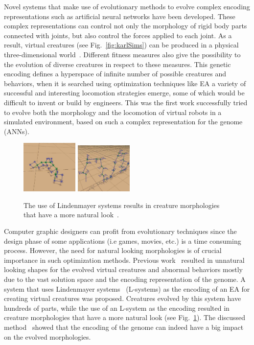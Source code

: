 Novel systems that make use of evolutionary methods to evolve complex encoding representations such as artificial neural networks have been developed. These complex representations can control not only the morphology of rigid body parts connected with joints, but also control the forces applied to each joint. As a result, virtual creatures (see Fig.~\ref{fig:karlSims}) can be produced in a physical three-dimensional world~\citep{sims1994evolving}. Different fitness measures also give the possibility to the evolution of diverse creatures in respect to these measures. This genetic encoding defines a hyperspace of infinite number of possible creatures and behaviors, when it is searched using optimization techniques like EA a variety of successful and interesting locomotion strategies emerge, some of which would be difficult to invent or build by engineers. This was the first work successfully tried to evolve both the morphology and the locomotion of virtual robots in a simulated environment, based on such a complex representation for the genome (ANNs).

\begin{figure}[t!]
\centering
\includegraphics[width=0.25\textwidth,height=0.2\textwidth]{../Figures/Misc/lsystems1.png}
\includegraphics[width=0.25\textwidth,height=0.2\textwidth]{../Figures/Misc/lsystems2.png}
\caption{The use of Lindenmayer systems results in creature morphologies that have a more natural look~\citep{hornby2001evolving}.}
\label{fig:lsystems}
\end{figure}

Computer graphic designers can profit from evolutionary techniques since the design phase of some applications (i.e games, movies, etc.) is a time consuming process. However, the need for natural looking morphologies is of crucial importance in such optimization methods. Previous work~\citep{lipson2000automatic,sims1994evolving} resulted in unnatural looking shapes for the evolved virtual creatures and abnormal behaviors mostly due to the vast solution space and the encoding representation of the genome. A system that uses Lindenmayer systems~\citep{hornby2001evolving} (L-systems) as the encoding of an EA for creating virtual creatures was proposed. Creatures evolved by this system have hundreds of parts, while the use of an L-system as the encoding resulted in creature morphologies that have a more natural look (see Fig.~\ref{fig:lsystems}). The discussed method~\citep{hornby2001evolving} showed that the encoding of the genome can indeed have a big impact on the evolved morphologies.

